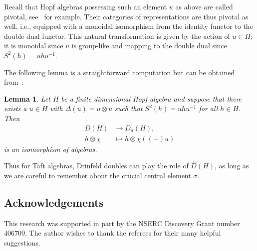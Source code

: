 \documentclass[10pt,a4paper]{amsart}
\numberwithin{equation}{section}
\newtheorem{Lemma}[Theorem]{Lemma}
\newcommand{\ot}{\otimes}
\begin{document}
Recall that Hopf algebras possessing such an element $u$ as above are called pivotal, see~\cite{pivot, spherical} for example. Their categories of representations are thus pivotal as well, i.e., equipped with a monoidal isomorphism from the identity functor to the double dual functor. This natural transformation is given by the action of $u\in H$; it is monoidal since $u$ is group-like and mapping to the double dual since $S^2(h)=uhu^{-1}$.

The following lemma is a straightforward computation but can be obtained from~\cite{gentaft}:

\begin{Lemma}\label{uhu}
Let $H$ be a finite dimensional Hopf algebra and suppose that there exists a $u\in H$ with $\Delta(u)=u\ot u$ such that $S^2(h)=uhu^{-1}$ for all $h\in H$. Then
\begin{align*}
D(H)&\to D_a(H),
\\
h\ot \chi&\mapsto h\ot \chi((-)u)
\end{align*} is an isomorphism of algebras.
\end{Lemma}

Thus for Taft algebras, Drinfeld doubles can play the role of $\widehat{D}(H)$, as long as we are careful to remember about the crucial central element $\sigma$.

\subsection*{Acknowledgements}

This research was supported in part by the NSERC Discovery Grant number 406709. The author wishes to thank the referees for their many helpful suggestions.

\end{document}
